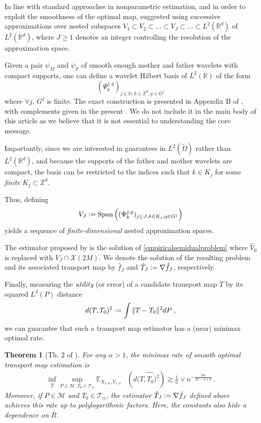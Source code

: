 \documentclass{article}
\theoremstyle{plain}
\newtheorem{theorem}{Theorem}[section]
\theoremstyle{definition}
\theoremstyle{remark}
\newcommand{\R}[0]{\mathbb{R}}
\newcommand{\N}[0]{\mathbb{N}}
\newcommand{\Z}[0]{\mathbb{Z}}
\newcommand{\E}[0]{\mathbb{E}}
\newcommand{\eqdef}{\vcentcolon=}
\newcommand\p[1]{\left( {#1}\right)}
\newcommand\vspan[0]{\operatorname{Span}}
\begin{document}
In line with standard approaches in nonparametric estimation, and in order to exploit the smoothness of the optimal map, \citet{hutter2021minimax} suggested using successive approximations over nested subspaces $V_1 \subset V_2 \subset \dots \subset V_J \subset \dots \subset L^2(\R^d)$ of $L^2(\R^d)$, where $J \geq 1$ denotes an integer controlling the resolution of the approximation space. %

Given a pair $\psi_M$ and $\psi_F$ of smooth enough mother and father wavelets with compact supports, one can define a wavelet Hilbert basis of $L^2(\R)$ of the form
\begin{equation}
    (\Psi_k^{j, g})_{j \in \N, k \in \Z^d, g \in G^j}
\end{equation}
 where $\forall j$, $G^j$ is finite. The exact construction is presented in Appendix B of \cite{hutter2021minimax}, with complements given in the present  . We do not include it in the main body of this article as we believe that it is not essential to understanding the core message.

Importantly, since we are interested in guarantees in $L^2(\tilde{\Omega})$ rather than $L^2(\R^d)$, and because the supports of the father and mother wavelets are compact, the basis can be restricted to the indices such that $k \in K_j$ for some \textit{finite} $K_j \subset \Z^d$.

Thus, defining 
\begin{equation}
    V_J \eqdef \vspan \p{(\Psi_k^{j, g})_{{j \leq J}, k \in K_j, g \in G^j} }
\end{equation}
yields a sequence of \emph{finite-dimensional} nested approximation spaces.

The estimator proposed by \citet{hutter2021minimax} is the solution of \eqref{empiricalsemidualproblem} where $\hat{V}_0$ is replaced with $V_J \cap \mathcal{X}(2M)$. 
We denote the solution of the resulting problem and its associated transport map by $\hat{f}_J$ and $\hat{T}_J \eqdef \nabla \hat{f}_J$, respectively.  

Finally, measuring the \textit{utility} (or error) of a candidate transport map $T$ by its squared $L^2(P)$ distance
\begin{equation}
    d(T, T_0)^2 \eqdef \int \| T - T_0 \|^2 dP \;,
\end{equation}
we can guarantee that such a transport map estimator has a (near) minimax optimal rate. 

\begin{theorem}[{Th. 2 of \cite{hutter2021minimax}}]
    For any $\alpha>1$, the minimax rate of smooth optimal transport map estimation is
    \begin{align}
         \inf_{\hat{T}} \sup_{P\in\mathcal{M},T_0\in\mathcal{T}_\alpha} \E_{X_{1:n}, Y_{1:n}} &\p{d(\hat{T, T_0)^2}} \gtrsim \frac{1}{n} \vee n^{- \frac{2 \alpha}{2 \alpha - 2 + d}} \, . 
    \end{align} 
    Moreover, if $P\in\mathcal{M}$ and $T_0\in\mathcal{T}_{\alpha}$, the estimator $\hat{T}_J \eqdef \nabla \hat{f}_J$ defined above achieves this rate up to polylogarithmic factors. Here, the constants also hide a dependence on $R$.
\end{theorem}
\end{document}
